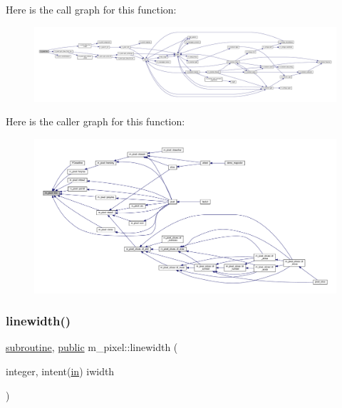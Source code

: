 Here is the call graph for this function\+:
\nopagebreak
\begin{figure}[H]
\begin{center}
\leavevmode
\includegraphics[width=350pt]{namespacem__pixel_a491951b89e60d0d40d67f22d987da894_cgraph}
\end{center}
\end{figure}
Here is the caller graph for this function\+:
\nopagebreak
\begin{figure}[H]
\begin{center}
\leavevmode
\includegraphics[width=350pt]{namespacem__pixel_a491951b89e60d0d40d67f22d987da894_icgraph}
\end{center}
\end{figure}
\mbox{\label{namespacem__pixel_a16379e283aaa99e2e0ba1eb26e93452d}} 
\subsubsection{\texorpdfstring{linewidth()}{linewidth()}}
{\footnotesize\ttfamily \hyperlink{M__stopwatch_83_8txt_acfbcff50169d691ff02d4a123ed70482}{subroutine}, \hyperlink{M__stopwatch_83_8txt_a2f74811300c361e53b430611a7d1769f}{public} m\+\_\+pixel\+::linewidth (\begin{DoxyParamCaption}\item[{integer, intent(\hyperlink{M__journal_83_8txt_afce72651d1eed785a2132bee863b2f38}{in})}]{iwidth }\end{DoxyParamCaption})}



